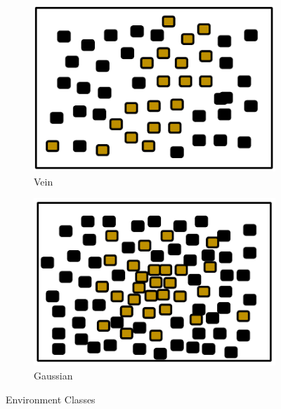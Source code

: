 \begin{figure} [h]
\begin{subfigure}[b]{0.2\textwidth}
                \includegraphics[width=\textwidth]{chapters/chapter4/figures/veinenv.pdf}
                \caption{Vein}
                \label{fig:veinenv}
        \end{subfigure}  
        \begin{subfigure}[b]{0.2\textwidth}
                        \includegraphics[width=\textwidth]{chapters/chapter4/figures/gaussianenv}
                        \caption{Gaussian}
                        \label{fig:gaussianenv}
       \end{subfigure}
        \caption{Environment Classes}\label{fig:environments}
\end{figure}


